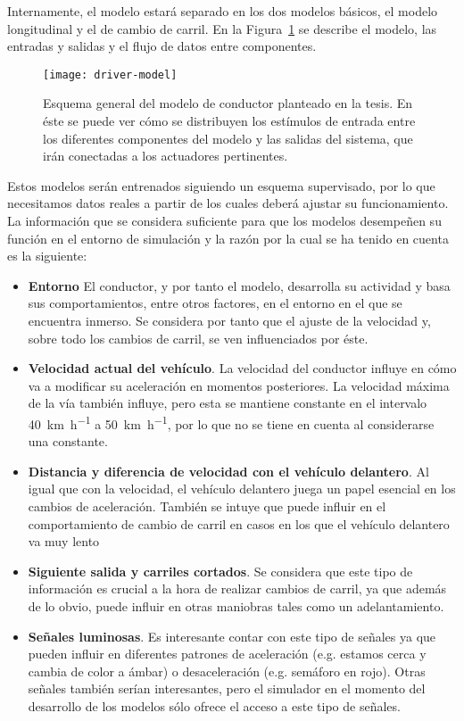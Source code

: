 Internamente, el modelo estará separado en los dos modelos básicos, el modelo longitudinal y el de cambio de carril. En la Figura~\ref{fig:overall-driver-model-schema} se describe el modelo, las entradas y salidas y el flujo de datos entre componentes.

\begin{figure}
	\centering
	\texttt{[image: driver-model]}
	\caption[Esquema general del modelo de conductor planteado]{Esquema general del modelo de conductor planteado en la tesis. En éste se puede ver cómo se distribuyen los estímulos de entrada entre los diferentes componentes del modelo y las salidas del sistema, que irán conectadas a los actuadores pertinentes.}
	\label{fig:overall-driver-model-schema}
\end{figure}

Estos modelos serán entrenados siguiendo un esquema supervisado, por lo que necesitamos datos reales a partir de los cuales deberá ajustar su funcionamiento. La información que se considera suficiente para que los modelos desempeñen su función en el entorno de simulación y la razón por la cual se ha tenido en cuenta es la siguiente:

\begin{itemize}
	\item \textbf{Entorno} El conductor, y por tanto el modelo, desarrolla su actividad y basa sus comportamientos, entre otros factores, en el entorno en el que se encuentra inmerso. Se considera por tanto que el ajuste de la velocidad y, sobre todo los cambios de carril, se ven influenciados por éste.
	\item \textbf{Velocidad actual del vehículo}. La velocidad del conductor influye en cómo va a modificar su aceleración en momentos posteriores. La velocidad máxima de la vía también influye, pero esta se mantiene constante en el intervalo \SI{40}{\kilo\meter\per\hour} a \SI{50}{\kilo\meter\per\hour}, por lo que no se tiene en cuenta al considerarse una constante.
	\item \textbf{Distancia y diferencia de velocidad con el vehículo delantero}. Al igual que con la velocidad, el vehículo delantero juega un papel esencial en los cambios de aceleración. También se intuye que puede influir en el comportamiento de cambio de carril en casos en los que el vehículo delantero va muy lento
	\item \textbf{Siguiente salida y carriles cortados}. Se considera que este tipo de información es crucial a la hora de realizar cambios de carril, ya que además de lo obvio, puede influir en otras maniobras tales como un adelantamiento.
	\item \textbf{Señales luminosas}. Es interesante contar con este tipo de señales ya que pueden influir en diferentes patrones de aceleración (e.g. estamos cerca y cambia de color a ámbar) o desaceleración (e.g. semáforo en rojo). Otras señales también serían interesantes, pero el simulador en el momento del desarrollo de los modelos sólo ofrece el acceso a este tipo de señales.
\end{itemize}

